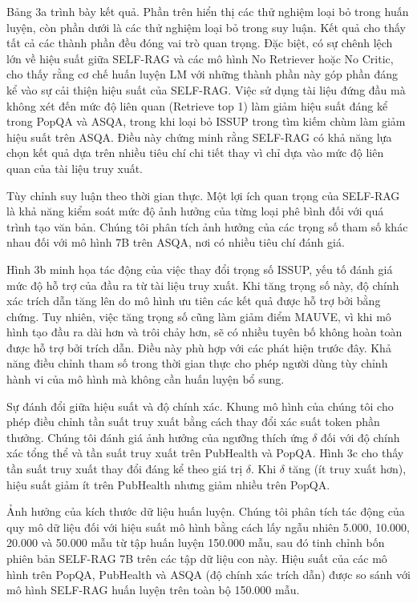 \documentclass{article}
\begin{document}
Bảng 3a trình bày kết quả. Phần trên hiển thị các thử nghiệm loại bỏ trong huấn luyện, còn phần dưới là các thử nghiệm loại bỏ trong suy luận. Kết quả cho thấy tất cả các thành phần đều đóng vai trò quan trọng. Đặc biệt, có sự chênh lệch lớn về hiệu suất giữa SELF-RAG và các mô hình No Retriever hoặc No Critic, cho thấy rằng cơ chế huấn luyện LM với những thành phần này góp phần đáng kể vào sự cải thiện hiệu suất của SELF-RAG. Việc sử dụng tài liệu đứng đầu mà không xét đến mức độ liên quan (Retrieve top 1) làm giảm hiệu suất đáng kể trong PopQA và ASQA, trong khi loại bỏ ISSUP trong tìm kiếm chùm làm giảm hiệu suất trên ASQA. Điều này chứng minh rằng SELF-RAG có khả năng lựa chọn kết quả dựa trên nhiều tiêu chí chi tiết thay vì chỉ dựa vào mức độ liên quan của tài liệu truy xuất.

Tùy chỉnh suy luận theo thời gian thực. Một lợi ích quan trọng của SELF-RAG là khả năng kiểm soát mức độ ảnh hưởng của từng loại phê bình đối với quá trình tạo văn bản. Chúng tôi phân tích ảnh hưởng của các trọng số tham số khác nhau đối với mô hình 7B trên ASQA, nơi có nhiều tiêu chí đánh giá.

Hình 3b minh họa tác động của việc thay đổi trọng số ISSUP, yếu tố đánh giá mức độ hỗ trợ của đầu ra từ tài liệu truy xuất. Khi tăng trọng số này, độ chính xác trích dẫn tăng lên do mô hình ưu tiên các kết quả được hỗ trợ bởi bằng chứng. Tuy nhiên, việc tăng trọng số cũng làm giảm điểm MAUVE, vì khi mô hình tạo đầu ra dài hơn và trôi chảy hơn, sẽ có nhiều tuyên bố không hoàn toàn được hỗ trợ bởi trích dẫn. Điều này phù hợp với các phát hiện trước đây. Khả năng điều chỉnh tham số trong thời gian thực cho phép người dùng tùy chỉnh hành vi của mô hình mà không cần huấn luyện bổ sung.

Sự đánh đổi giữa hiệu suất và độ chính xác. Khung mô hình của chúng tôi cho phép điều chỉnh tần suất truy xuất bằng cách thay đổi xác suất token phần thưởng. Chúng tôi đánh giá ảnh hưởng của ngưỡng thích ứng $\delta$ đối với độ chính xác tổng thể và tần suất truy xuất trên PubHealth và PopQA. Hình 3c cho thấy tần suất truy xuất thay đổi đáng kể theo giá trị $\delta$. Khi $\delta$ tăng (ít truy xuất hơn), hiệu suất giảm ít trên PubHealth nhưng giảm nhiều trên PopQA.

Ảnh hưởng của kích thước dữ liệu huấn luyện. Chúng tôi phân tích tác động của quy mô dữ liệu đối với hiệu suất mô hình bằng cách lấy ngẫu nhiên 5.000, 10.000, 20.000 và 50.000 mẫu từ tập huấn luyện 150.000 mẫu, sau đó tinh chỉnh bốn phiên bản SELF-RAG 7B trên các tập dữ liệu con này. Hiệu suất của các mô hình trên PopQA, PubHealth và ASQA (độ chính xác trích dẫn) được so sánh với mô hình SELF-RAG huấn luyện trên toàn bộ 150.000 mẫu.
\end{document}
